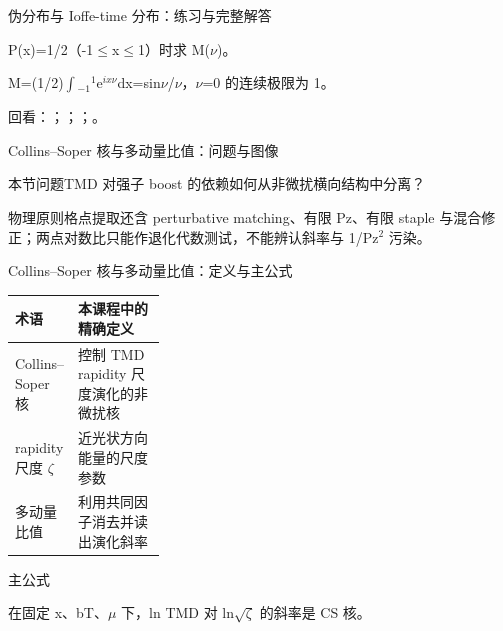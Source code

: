 \begin{frame}[t]{伪分布与 Ioffe-time 分布：练习与完整解答}
\footnotesize
\begin{block}{}P(x)=1/\allowbreak{}2（-1\ensuremath{\le}x\ensuremath{\le}1）时求 M(\ensuremath{\nu})。\end{block}
\begin{exampleblock}{}M=(1/\allowbreak{}2)\ensuremath{\int}\ensuremath{_{-1}}\ensuremath{^{1}}e\ensuremath{^{ix\nu}}dx=sin\ensuremath{\nu}/\allowbreak{}\ensuremath{\nu}，\ensuremath{\nu}=0 的连续极限为 1。\end{exampleblock}
\vfill
\scriptsize 回看：；；；。
\end{frame}

\begin{frame}[t]{Collins--Soper 核与多动量比值：问题与图像}
\footnotesize
\begin{block}{本节问题}TMD 对强子 boost 的依赖如何从非微扰横向结构中分离？\end{block}
\begin{block}{物理原则}\quad 格点提取还含 perturbative matching、有限 Pz、有限 staple 与混合修正；两点对数比只能作退化代数测试，不能辨认斜率与 1/\allowbreak{}Pz\ensuremath{^{2}} 污染。\end{block}
\end{frame}

\begin{frame}[t]{Collins--Soper 核与多动量比值：定义与主公式}
\footnotesize\begin{tabularx}{\linewidth}{p{0.30\linewidth}Y}
\toprule 术语 & 本课程中的精确定义\\\midrule
{} Collins--Soper 核 & 控制 TMD rapidity 尺度演化的非微扰核\\
 rapidity 尺度 \ensuremath{\zeta} & 近光状方向能量的尺度参数\\
 多动量比值 & 利用共同因子消去并读出演化斜率\\
\bottomrule\end{tabularx}\vspace{0.15cm}
\begin{block}{ 主公式}\centering{}\end{block}
在固定 x、bT、\ensuremath{\mu} 下，ln TMD 对 ln\ensuremath{\sqrt{\zeta}} 的斜率是 CS 核。
\end{frame}

